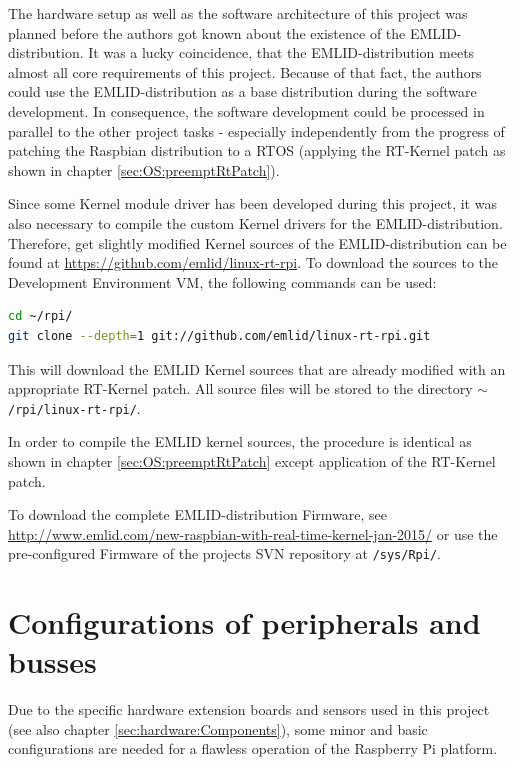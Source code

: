 The hardware setup as well as the software architecture of this project was planned before the authors got known about the existence of the EMLID-distribution. It was a lucky coincidence, that the EMLID-distribution meets almost all core requirements of this project. Because of that fact, the authors could use the EMLID-distribution as a base distribution during the software development. In consequence, the software development could be processed in parallel to the other project tasks - especially independently from the progress of patching the Raspbian distribution to a RTOS (applying the RT-Kernel patch as shown in chapter \ref{sec:OS:preemptRtPatch}).

Since some Kernel module driver has been developed during this project, it was also necessary to compile the custom Kernel drivers for the EMLID-distribution. Therefore, get slightly modified Kernel sources of the EMLID-distribution can be found at \url{https://github.com/emlid/linux-rt-rpi}. To download the sources to the Development Environment VM, the following commands can be used:
\begin{lstlisting}[language=bash,otherkeywords={cd,dd,sudo}]
cd ~/rpi/
git clone --depth=1 git://github.com/emlid/linux-rt-rpi.git
\end{lstlisting}

This will download the EMLID Kernel sources that are already modified with an appropriate RT-Kernel patch. All source files will be stored to the directory \texttt{$\sim$/rpi/linux-rt-rpi/}.

In order to compile the EMLID kernel sources, the procedure is identical as shown in chapter \ref{sec:OS:preemptRtPatch} except application of the RT-Kernel patch.

To download the complete EMLID-distribution Firmware, see \url{http://www.emlid.com/new-raspbian-with-real-time-kernel-jan-2015/} or use the pre-configured Firmware of the projects SVN repository at \texttt{/sys/Rpi/}.

\section{Configurations of peripherals and busses}
\label{sec:OS:configProject}

Due to the specific hardware extension boards and sensors used in this project (see also chapter \ref{sec:hardware:Components}), some minor and basic configurations are needed for a flawless operation of the Raspberry Pi platform.

